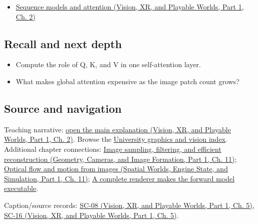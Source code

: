 \hypertarget{appendix-a9d5dfdd164a-full-teaching-explanation}{}

\begin{itemize}
\tightlist
\item
  \href{../07-Vision-XR-and-Playable-Worlds-P01/main.pdf\#nameddest=04-visual-computing-ii-ch031-sequence-models-and-attention}{Sequence models and attention (Vision, XR, and Playable Worlds, Part 1, Ch. 2)}
\end{itemize}

\subsection{Recall and next depth}\label{appendix-a9d5dfdd164a-recall-and-next-depth}

\hypertarget{appendix-a9d5dfdd164a-recall-and-next-depth}{}

\begin{itemize}
\tightlist
\item
  Compute the role of Q, K, and V in one self-attention layer.
\item
  What makes global attention expensive as the image patch count grows?
\end{itemize}

\subsection{Source and navigation}\label{appendix-a9d5dfdd164a-source-and-navigation}

\hypertarget{appendix-a9d5dfdd164a-source-and-navigation}{}

Teaching narrative: \href{../07-Vision-XR-and-Playable-Worlds-P01/main.pdf\#nameddest=04-visual-computing-ii-ch031-sequence-models-and-attention}{open the main explanation (Vision, XR, and Playable Worlds, Part 1, Ch. 2)}. Browse the \hyperref[appendix-a6d556a4ef50-university-graphics-vision-and-photography---independent-series]{University graphics and vision index}. Additional chapter connections: \href{../03-Geometry-Cameras-and-Image-Formation-P01/main.pdf\#nameddest=03-visual-computing-i-ch004-image-sampling-filtering-and-efficient-reconstruction}{Image sampling, filtering, and efficient reconstruction (Geometry, Cameras, and Image Formation, Part 1, Ch. 11)}; \href{../05-Spatial-Worlds-Engine-State-and-Simulation-P01/main.pdf\#nameddest=04-visual-computing-ii-ch030-optical-flow-and-motion-from-images}{Optical flow and motion from images (Spatial Worlds, Engine State, and Simulation, Part 1, Ch. 11)}; \hyperref[04-visual-computing-ii-ch035-a-complete-renderer-makes-the-forward-model-executable]{A complete renderer makes the forward model executable}.

Caption/source records: \href{../07-Vision-XR-and-Playable-Worlds-P01/main.pdf\#nameddest=04-visual-computing-ii-ch036-sc-08---stanford-cs231n-spring-2025-lecture-8-attention-and-transformers}{SC-08 (Vision, XR, and Playable Worlds, Part 1, Ch. 5)}, \href{../07-Vision-XR-and-Playable-Worlds-P01/main.pdf\#nameddest=04-visual-computing-ii-ch036-sc-16---stanford-cs231n-deep-learning-for-computer-vision-spring-2025-lecture-16-vision-and-language}{SC-16 (Vision, XR, and Playable Worlds, Part 1, Ch. 5)}.
